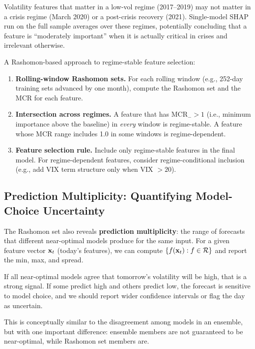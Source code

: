 Volatility features that matter in a low-vol regime (2017--2019) may not
matter in a crisis regime (March 2020) or a post-crisis recovery (2021).
Single-model SHAP run on the full sample averages over these regimes,
potentially concluding that a feature is ``moderately important'' when it is
actually critical in crises and irrelevant otherwise.

A Rashomon-based approach to regime-stable feature selection:

\begin{enumerate}[leftmargin=1.8em]
  \item \textbf{Rolling-window Rashomon sets.}  For each rolling window
    (e.g., 252-day training sets advanced by one month), compute the
    Rashomon set and the MCR for each feature.
  \item \textbf{Intersection across regimes.}  A feature that has
    $\text{MCR}_{-} > 1$ (i.e., minimum importance above the baseline) in
    \emph{every} window is regime-stable.  A feature whose MCR range
    includes 1.0 in some windows is regime-dependent.
  \item \textbf{Feature selection rule.}  Include only regime-stable
    features in the final model.  For regime-dependent features, consider
    regime-conditional inclusion (e.g., add VIX term structure only when
    VIX $> 20$).
\end{enumerate}

\subsection{Prediction Multiplicity: Quantifying Model-Choice Uncertainty}

The Rashomon set also reveals \textbf{prediction multiplicity}: the range of
forecasts that different near-optimal models produce for the same input.  For
a given feature vector $\mathbf{x}_t$ (today's features), we can compute
$\{f(\mathbf{x}_t) : f \in \mathcal{R}\}$ and report the min, max, and spread.

If all near-optimal models agree that tomorrow's volatility will be high,
that is a strong signal.  If some predict high and others predict low, the
forecast is sensitive to model choice, and we should report wider
confidence intervals or flag the day as uncertain.

This is conceptually similar to the disagreement among models in an ensemble,
but with one important difference: ensemble members are not guaranteed to be
near-optimal, while Rashomon set members are.

